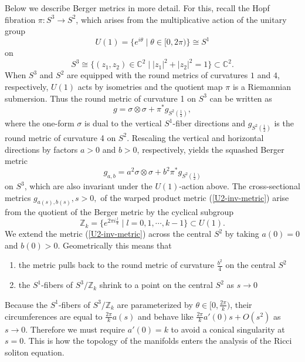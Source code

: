 \documentclass{amsart}
\theoremstyle{definition}
\theoremstyle{remark}
\numberwithin{equation}{section}
\begin{document}
Below we describe Berger metrics in more detail. For this, recall the Hopf fibration $\pi: S^3 \rightarrow S^2$, which arises from the multiplicative action of the unitary group
\begin{equation*}
U(1) = \{ e^{i \theta} \; \big | \; \theta \in [0, 2\pi) \} \cong S^1
\end{equation*} on 
\begin{equation*}
S^3 \cong \{ (z_1, z_2) \in \mathbb{C}^2 \; \big |  \; |z_1|^2 + |z_2|^2 = 1 \} \subset \mathbb{C}^2.
\end{equation*}
When $S^3$ and $S^2$ are equipped with the round metrics of curvatures $1$ and $4$, respectively, $U(1)$ acts by isometries and the quotient map $\pi$ is a Riemannian submersion. Thus the round metric of curvature 1 on $S^3$ can be written as
\begin{equation}
\label{warped}
g = \sigma \otimes \sigma + \pi^{\ast}g_{S^2(\frac{1}{2})},
\end{equation}
where the one-form $\sigma$ is dual to the vertical $S^1$-fiber directions and $g_{S^2(\frac{1}{2})}$ is the round metric of curvature 4 on $S^2$. Rescaling the vertical and horizontal directions by factors $a>0$ and $b>0$, respectively, yields the squashed Berger metric
\begin{equation*}
g_{a,b} = a^2 \sigma \otimes \sigma +  b^2 \pi^{\ast}g_{S^2(\frac{1}{2})}
\end{equation*}
on $S^3$, which are also invariant under the $U(1)$-action above. The cross-sectional metrics $g_{a(s),b(s)}, s>0,$ of the warped product metric (\ref{U2-inv-metric}) arise from the quotient of the Berger metric by the cyclical subgroup 
\begin{equation*} 
\mathbb{Z}_k = \{ e^{2\pi i \frac{l}{k}} \; \big | \; l = 0, 1, \cdots, k-1\} \subset U(1).
\end{equation*}  
We extend the metric (\ref{U2-inv-metric}) across the central $S^2$ by taking $a(0) = 0$ and $b(0) > 0$. Geometrically this means that 
\begin{enumerate}
\item the metric pulls back to the round metric of curvature $\frac{b^2}{4}$ on the central $S^2$
\item the $S^1$-fibers of $S^3/\mathbb{Z}_k$ shrink to a point on the central $S^2$ as $s \rightarrow 0$
\end{enumerate}
Because the $S^1$-fibers of $S^3/\mathbb{Z}_k$ are parameterized by $\theta \in [0,\frac{2\pi}{k})$, their circumferences are equal to $\frac{2\pi}{k}a(s)$ and behave like $\frac{2\pi}{k} a'(0)s + O(s^2)$ as $s \rightarrow 0$. Therefore we must require $a'(0) = k$ to avoid a conical singularity at $s=0$. This is how the topology of the manifolds enters the analysis of the Ricci soliton equation.
\end{document}
